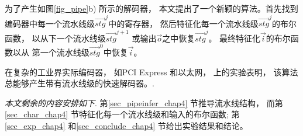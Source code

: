 为了产生如图\ref{fig_pipe}b) 所示的解码器，
本文提出了一个新颖的算法。首先找到编码器中每一个流水线级$\vec{stg}^j$中的寄存器，
然后特征化每一个流水线级$\vec{stg}^j$的布尔函数，
以从下一个流水线级$\vec{stg}^{j+1}$ 或输出$\vec{o}$之中恢复$\vec{stg}^j$。
最终特征化$\vec{i}$的布尔函数以从
第一个流水线级$\vec{stg}^0$中恢复$\vec{i}$。


在复杂的工业界实际编码器，
如PCI Express  和以太网，
上的实验表明，
该算法总能够产生带有流水线级的快速解码器。.


\emph{本文剩余的内容安排如下}.
第\ref{sec_pipeinfer_chap4} 节推导流水线结构，
而第\ref{sec_char_chap4} 节特征化每一个流水线级和输入的布尔函数;
第\ref{sec_exp_chap4} 和\ref{sec_conclude_chap4} 节给出实验结果和结论。


